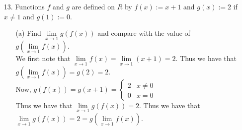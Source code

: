 \documentclass[12pt,letterpaper]{article}
\newcommand{\R}{\mathbb{R}}
\theoremstyle{case}
\theoremstyle{definition}
\newtheorem{lemma}[theorem]{Lemma}
\begin{document}
\begin{enumerate}
\begin{enumerate}
\begin{enumerate}
\begin{lemma}
						Since $f$ is bounded on some neighborhood of $c$, we know that $\exists\ \delta_0>0$ and $M>0$ such that $|x-c|<\delta_0 \implies |f(x)|<M$.\\
						
						Let $\varepsilon >0$ be given. Since $\lim\limits_{x \to c} g(x)=0$, we know that $\exists\ \delta_1 >0$ such that $|x-c|<\delta_1 \implies |g(x)|=|g(x)-0|<\frac{\varepsilon}{M}$.\\
						
						Choose $\delta := \min \{\delta_0, \delta_1\}$. Thus we now have
						\[|x-c|<\delta \implies |f(x)|<M \text{ and } |g(x)|<\frac{\varepsilon}{M} \implies |f(x)g(x)|<\varepsilon\]
						Thus we have that by the definition of the limit, $\lim\limits_{x \to c} fg(x)=0$.\\
						$\square$
					\end{lemma}
					\begin{proof}
						Let $f(x)=\begin{cases}
							\sin \frac{1}{x^2}, &x \neq 0\\
							0, &x=0
						\end{cases}$ \\
						
						and let $g(x)=x$ for $x \in \R$.\\
						
						Then we have that $|f(x)|\leq 1\ \forall\ x \in \R$. This gives us that $f$ is bounded in $\R$. Hence $\lim\limits_{x \to 0} g(x)=\lim\limits_{x \to 0} x = 0$. Thus we have that by \textit{Lemma 0.1}, we have that $\lim\limits_{x \to 0} f(x)=0 \implies \lim\limits_{x \to 0} x \sin \frac{1}{x^2}=0$.
					\end{proof}
				\end{enumerate}
			
			\item[13.] Functions $f$ and $g$ are defined on $R$ by $f(x):=x+1$ and $g(x):=2$ if $x \neq 1$ and $g(1):=0$.
				\begin{enumerate}
					\item[(a)] Find $\lim\limits_{x \to 1}g(f(x))$ and compare with the value of $g(\lim\limits_{x \to 1} f(x))$.\\
					
					We first note that $\lim\limits_{x \to 1} f(x) = \lim\limits_{x \to 1} (x+1)=2$. Thus we have that $g(\lim\limits_{x \to 1} f(x))=g(2)=2$.\\
					
					Now, $g(f(x))=g(x+1)=\begin{cases}
					2 & x \neq 0 \\
					0 & x=0
					\end{cases}$\\
					Thus we have that $\lim\limits_{x \to 1} g(f(x))=2$. Thus we have that $\lim\limits_{x \to 1} g(f(x))=2=g(\lim\limits_{x \to 1} f(x))$.
					

\end{enumerate}
\end{enumerate}
\end{enumerate}
\end{document}
